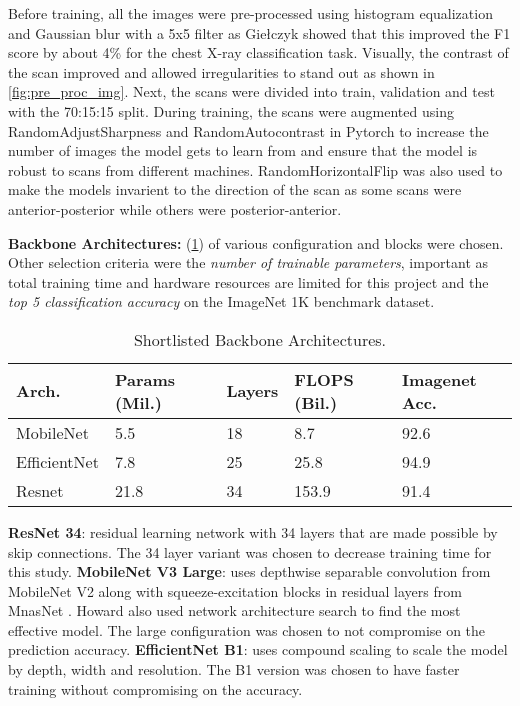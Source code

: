 \documentclass[10pt,twocolumn,letterpaper]{article}
\begin{document}
Before training, all the images were pre-processed using histogram equalization and Gaussian blur 
with a 5x5 filter as Giełczyk \etal \cite{gielczyk2022pre} showed that this improved the 
F1 score by about 4\% for the chest X-ray classification task. Visually, the contrast of the scan improved 
and allowed irregularities to stand out as shown in \cref{fig:pre_proc_img}. Next, the 
scans were divided into train, validation and test with the 70:15:15 split. 
During training, the scans were augmented using RandomAdjustSharpness and 
RandomAutocontrast in Pytorch \cite{transforms} to increase the number of images the 
model gets to learn from and ensure that the model is robust to scans from different machines.
RandomHorizontalFlip was also used to make the models invarient to the direction of the scan as 
some scans were anterior-posterior while others were posterior-anterior.

\textbf{Backbone Architectures:} (\cref{tab:selArch}) of various configuration and blocks were chosen. Other selection criteria were the \textit{number of trainable parameters}, important as total training time and hardware resources are limited for this project and the \textit{top 5 classification accuracy} on the ImageNet 1K benchmark dataset.
\begin{table}
  \centering
  \begin{tabular}{p{1.7cm}|p{1cm}|p{1cm}|p{1cm}|p{1cm}}
  \toprule
  Arch. & Params (Mil.) & Layers & FLOPS (Bil.) & Imagenet Acc.\\
  \midrule
  MobileNet & 5.5 & 18 & 8.7 & 92.6\\
  \midrule
  EfficientNet & 7.8 & 25 & 25.8 & 94.9\\
  \midrule
  Resnet & 21.8 & 34 & 153.9 & 91.4\\
  \bottomrule
  \end{tabular}
  \caption{Shortlisted Backbone Architectures.}
  \label{tab:selArch}
\end{table}
\textbf{ResNet 34}: residual learning network with 34 layers that are made possible by skip 
connections. The 34 layer variant was chosen to decrease training time for this study. 
\cite{he2016deep}
\textbf{MobileNet V3 Large}: uses depthwise separable convolution from MobileNet V2 
\cite{sandler2018mobilenetv2} along with squeeze-excitation blocks in residual layers 
from MnasNet \cite{tan2019mnasnet}. Howard \etal \cite{howard2019searching} also used 
network architecture search to find the most effective model. The large configuration 
was chosen to not compromise on the prediction accuracy.
\textbf{EfficientNet B1}: uses compound scaling to scale the model by depth, width and 
resolution. The B1 version was chosen to have faster training without compromising on the 
accuracy. \cite{tan2019efficientnet}
\end{document}
